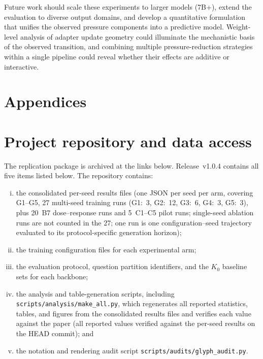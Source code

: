 \documentclass[a4paper,fleqn]{cas-dc}
\newif\ifshowchanges
\newcommand{\rev}[1]{\ifshowchanges{\color{blue}#1}\else{#1}\fi}
\begin{document}
Future work should scale these experiments to larger models (7B+), extend the
evaluation to diverse output domains, and develop a quantitative formulation
that unifies the observed pressure components into a predictive model.
Weight-level analysis of adapter update geometry could illuminate the
mechanistic basis of the observed transition, and combining multiple
pressure-reduction strategies within a single pipeline could reveal whether
their effects are additive or interactive.





\appendix
\section*{Appendices}

\section{Project repository and data access}\label{app:repo}

\rev{The replication package is archived at the links below. Release~v1.0.4 contains all five items listed below. The repository contains:
\begin{enumerate}[(i)]
  \item the consolidated per-seed results files (one JSON per seed per arm, covering G1--G5, 27 multi-seed training runs (G1:~3, G2:~12, G3:~6, G4:~3, G5:~3), plus 20~B7 dose--response runs and 5~C1--C5 pilot runs; single-seed ablation runs are not counted in the 27; one run is one configuration--seed trajectory evaluated to its protocol-specific generation horizon);
  \item the training configuration files for each experimental arm;
  \item the evaluation protocol, question partition identifiers, and the $K_0$ baseline sets for each backbone;
  \item the analysis and table-generation scripts, including \texttt{scripts/analysis/make\_all.py}, which regenerates all reported statistics, tables, and figures from the consolidated results files and verifies each value against the paper (\rev{all reported values verified against the per-seed results on the HEAD commit}); and
  \item the notation and rendering audit script \texttt{scripts/audits/glyph\_audit.py}.
\end{enumerate}
}
\end{document}
